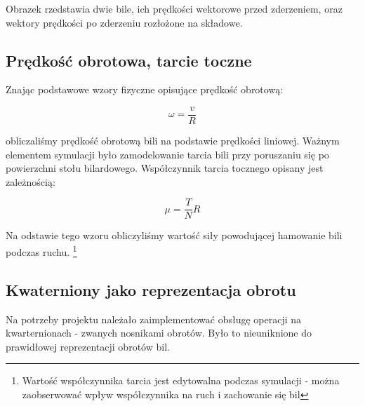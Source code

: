 Obrazek rzedstawia dwie bile, ich prędkości wektorowe przed zderzeniem, oraz wektory prędkości po zderzeniu rozłożone
na składowe.

\subsection{Prędkość obrotowa, tarcie toczne}

Znając podstawowe wzory fizyczne opisujące prędkość obrotową:

\begin{equation}
\omega = \frac{v}{R}
\end{equation}

obliczaliśmy prędkość obrotową bili na podstawie prędkości liniowej. Ważnym elementem symulacji było 
zamodelowanie tarcia bili przy poruszaniu się po powierzchni stołu bilardowego. Współczynnik tarcia tocznego 
opisany jest zależnością:

\begin{equation}
\mu = \frac{T}{N}R
\end{equation}

Na odstawie tego wzoru obliczyliśmy wartość siły powodującej hamowanie bili podczas ruchu.
\footnote{Wartość współczynnika tarcia jest edytowalna podczas symulacji - można zaobserwować wpływ 
współczynnika na ruch i zachowanie się bil}

\subsection{Kwaterniony jako reprezentacja obrotu}

Na potrzeby projektu należało zaimplementować obsługę operacji na kwarternionach - zwanych nosnikami obrotów.
Było to nieuniknione do prawidłowej reprezentacji obrotów bil.
